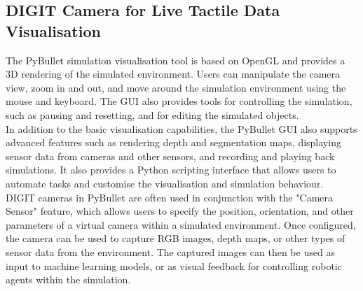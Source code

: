 \documentclass[11pt, a4paper]{report}
\begin{document}
\subsection{DIGIT Camera for Live Tactile Data Visualisation}\label{sec:3.2.3}
The PyBullet simulation visualisation tool is based on OpenGL and provides a 3D rendering of the simulated environment. Users can manipulate the camera view, zoom in and out, and move around the simulation environment using the mouse and keyboard. The GUI also provides tools for controlling the simulation, such as pausing and resetting, and for editing the simulated objects.\\

In addition to the basic visualisation capabilities, the PyBullet GUI also supports advanced features such as rendering depth and segmentation maps, displaying sensor data from cameras and other sensors, and recording and playing back simulations. It also provides a Python scripting interface that allows users to automate tasks and customise the visualisation and simulation behaviour.\\

DIGIT cameras in PyBullet \cite{Wang2022TACTO} are often used in conjunction with the "Camera Sensor" feature, which allows users to specify the position, orientation, and other parameters of a virtual camera within a simulated environment. Once configured, the camera can be used to capture RGB images, depth maps, or other types of sensor data from the environment. The captured images can then be used as input to machine learning models, or as visual feedback for controlling robotic agents within the simulation.
\end{document}
